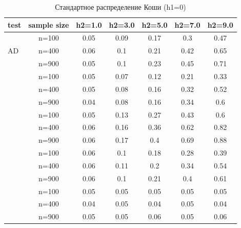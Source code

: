 \documentclass[12pt]{article}
\theoremstyle{break}
\begin{document}
\begin{table}[!h]
	\centering
	\caption{Стандартное распределение Коши (h1=0)}
	\begin{tabular}{l c c c c c c} 
		\toprule
		test & sample size & h2=1.0 & h2=3.0 & h2=5.0 & h2=7.0 & h2=9.0 \\ 
		\midrule
		\multirow{3}{*}{AD} 
		& n=100 & 0.05 & 0.09 & 0.17 & 0.3 & 0.47 \\ 
		& n=400 & 0.06 & 0.1 & 0.21 & 0.42 & 0.65 \\ 
		& n=900 & 0.05 & 0.1 & 0.23 & 0.45 & 0.71 \\ 
		\addlinespace
		\addlinespace
		\multirow{3}{*}{CM} 
		& n=100 & 0.05 & 0.07 & 0.12 & 0.21 & 0.33 \\ 
		& n=400 & 0.05 & 0.08 & 0.16 & 0.32 & 0.52 \\ 
		& n=900 & 0.04 & 0.08 & 0.16 & 0.34 & 0.6 \\ 
		\addlinespace
		\addlinespace
		\multirow{3}{*}{ET} 
		& n=100 & 0.05 & 0.13 & 0.27 & 0.43 & 0.6 \\ 
		& n=400 & 0.06 & 0.16 & 0.36 & 0.62 & 0.82 \\ 
		& n=900 & 0.06 & 0.17 & 0.4 & 0.69 & 0.88 \\ 
		\addlinespace
		\addlinespace
		\multirow{3}{*}{KS} 
		& n=100 & 0.06 & 0.1 & 0.18 & 0.28 & 0.39 \\ 
		& n=400 & 0.06 & 0.11 & 0.2 & 0.34 & 0.54 \\ 
		& n=900 & 0.06 & 0.1 & 0.21 & 0.4 & 0.61 \\ 
		\addlinespace
		\addlinespace
		\multirow{3}{*}{WMW} 
		& n=100 & 0.05 & 0.05 & 0.05 & 0.05 & 0.05 \\ 
		& n=400 & 0.04 & 0.05 & 0.04 & 0.05 & 0.04 \\ 
		& n=900 & 0.05 & 0.05 & 0.06 & 0.05 & 0.06 \\ 
		\bottomrule
	\end{tabular}
	\label{tbl:cauchy_pow_vs_h2}
\end{table}
\end{document}

